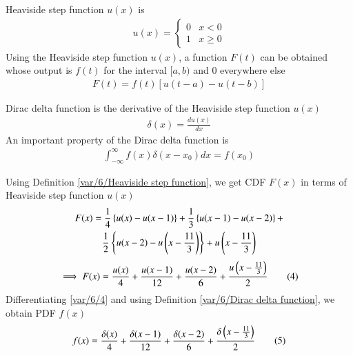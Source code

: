 \begin{definition}
    \label{var/6/Heaviside step function}
    Heaviside step function $u(x)$ is 
    \begin{align*}
    u(x)=                
        \begin{cases}
        0 & x<0 \\
        1 & x\geq 0
        \end{cases}
    \end{align*}
    Using the Heaviside step function $u(x)$, a function $F(t)$ can be obtained whose output is $f(t)$ for the interval $[a,b)$ and $0$ everywhere else
    \begin{align*}
        F(t)=f(t)[u(t-a) - u(t-b)] \tag{1} \label{var/6/1}
    \end{align*}
    \end{definition}
    \begin{definition}
    \label{var/6/Dirac delta function}
    Dirac delta function is the derivative of the Heaviside step function $u(x)$
    \begin{align*}
        \delta(x) = \frac{du(x)}{dx} \tag{2} \label{var/6/2}
    \end{align*}
    An important property of the Dirac delta function is 
    \begin{align*}
        \int_{-\infty}^{\infty}f(x)\delta(x-x_0)dx = f(x_0) \tag{3} \label{var/6/3}
    \end{align*}
    \end{definition}
    Using Definition \ref{var/6/Heaviside step function}, we get CDF $F(x)$ in terms of Heaviside step function $u(x)$
    \begin{multline*}
    F(x)=\frac{1}{4}\left\{u(x)-u(x-1)\right\}+\frac{1}{3}\left\{u(x-1)-u(x-2)\right\}+\\
    \frac{1}{2}\left\{u(x-2)-u\left(x-\frac{11}{3}\right)\right\}+u\left(x-\frac{11}{3}\right)
    \end{multline*}
    \begin{align*}
    \implies F(x)=\frac{u(x)}{4}+\frac{u(x-1)}{12}+\frac{u(x-2)}{6}+\frac{u\brak{x-\frac{11}{3}}}{2} \tag{4} \label{var/6/4}
    \end{align*}
    Differentiating \eqref{var/6/4} and using Definition \ref{var/6/Dirac delta function}, we obtain PDF $f(x)$ 
    \begin{align*}
    f(x)=\frac{\delta(x)}{4}+\frac{\delta(x-1)}{12}+\frac{\delta(x-2)}{6}+\frac{\delta\brak{x-\frac{11}{3}}}{2} \tag{5} \label{var/6/5}
    \end{align*}
